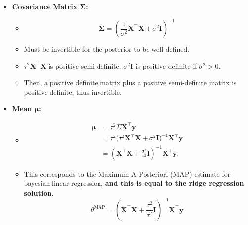 \begin{itemize}
    \item \textbf{Covariance Matrix \( \boldsymbol{\Sigma} \):}
          \begin{itemize}
              \item $$\mathbf{\Sigma}=\left(\frac{1}{\sigma^{2}}\mathbf{X}^{\top}\mathbf{X}+\sigma^{2}\mathbf{I}\right)^{-1}$$
              \item Must be invertible for the posterior to be well-defined.
              \item \( \tau^2\boldsymbol{X}^\top \boldsymbol{X} \) is positive semi-definite. \( \sigma^2 \mathbf{I} \) is positive definite if \( \sigma^2 > 0 \).
              \item Then, a positive definite matrix plus a positive semi-definite matrix is positive definite, thus invertible.
          \end{itemize}

    \item \textbf{Mean \( \boldsymbol{\mu} \):}
          \begin{itemize}
              \item \begin{align*}
                        \bm{\mu} & = \tau^2 \Sigma \bm{X}^\top \bm{y}                                                            \\
                                 & = \tau^2 \big( \tau^2 \bm{X}^\top \bm{X} + \sigma^2 \bm{I} \big)^{-1} \bm{X}^\top \bm{y}      \\
                                 & = \left( \bm{X}^\top \bm{X} + \frac{\sigma^2}{\tau^2} \bm{I} \right)^{-1} \bm{X}^\top \bm{y}.
                    \end{align*}

              \item This corresponds to the Maximum A Posteriori (MAP) estimate for bayesian linear regression, \textbf{and this is equal to the ridge regression solution.} 
              \[
              \theta^{\text{MAP}} = \left( \bm{X}^\top \bm{X} + \frac{\sigma^2}{\tau^2} \bm{I} \right)^{-1} \bm{X}^\top \bm{y}
                \]

          \end{itemize}
\end{itemize}

